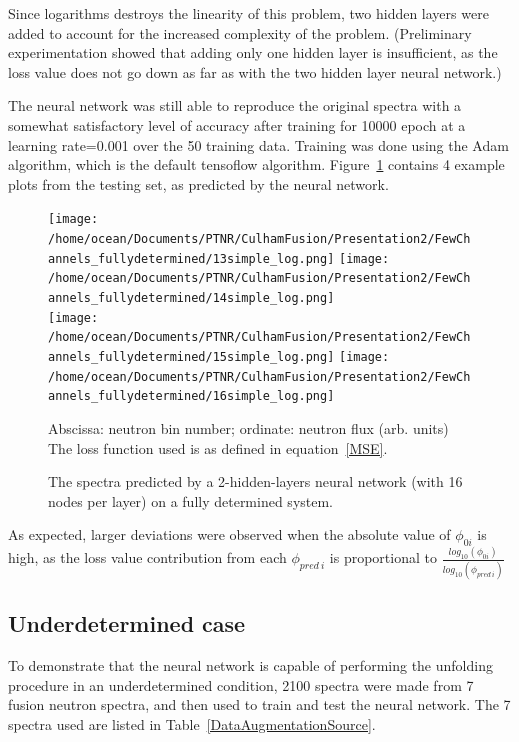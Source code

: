 \documentclass[a4paper, 12pt]{article}
\begin{document}
Since logarithms destroys the linearity of this problem, two hidden layers were added to account for the increased complexity of the problem. (Preliminary experimentation showed that adding only one hidden layer is insufficient, as the loss value does not go down as far as with the two hidden layer neural network.)

The neural network was still able to reproduce the original spectra with a somewhat satisfactory level of accuracy after training for 10000 epoch at a learning rate=0.001 over the 50 training data. Training was done using the Adam algorithm, which is the default tensoflow algorithm. Figure~\ref{5x5} contains 4 example plots from the testing set, as predicted by the neural network.

\begin{figure}
\centering
\texttt{[image: /home/ocean/Documents/PTNR/CulhamFusion/Presentation2/FewChannels\_fullydetermined/13simple\_log.png]}
\texttt{[image: /home/ocean/Documents/PTNR/CulhamFusion/Presentation2/FewChannels\_fullydetermined/14simple\_log.png]}\\
\texttt{[image: /home/ocean/Documents/PTNR/CulhamFusion/Presentation2/FewChannels\_fullydetermined/15simple\_log.png]}
\texttt{[image: /home/ocean/Documents/PTNR/CulhamFusion/Presentation2/FewChannels\_fullydetermined/16simple\_log.png]}
\caption{The spectra predicted by a 2-hidden-layers neural network (with 16 nodes per layer) on a fully determined system.} \label{5x5}
Abscissa: neutron bin number; ordinate: neutron flux (arb. units)\\
The loss function used is as defined in equation~\ref{MSE}.
\end{figure}

As expected, larger deviations were observed when the absolute value of $\phi_{0i}$ is high, as the loss value contribution from each $\phi_{pred\:i}$ is proportional to $\frac{log_{10}(\phi_{0i})}{log_{10}(\phi_{pred\:i})}$

\subsection{Underdetermined case}\label{Underdetermined case}
To demonstrate that the neural network is capable of performing the unfolding procedure in an underdetermined condition, 2100 spectra were made from 7 fusion neutron spectra, and then used to train and test the neural network. The 7 spectra used are listed in Table~\ref{DataAugmentationSource}.
\end{document}
